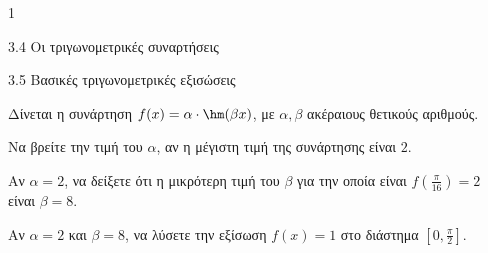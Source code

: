 \begin{ylh}{1}
\item 3.4 Οι τριγωνομετρικές συναρτήσεις
\item 3.5 Βασικές τριγωνομετρικές εξισώσεις
\end{ylh}
Δίνεται η συνάρτηση $f(x) = \alpha \cdot \hm (\beta x)$, με $\alpha, \beta$ ακέραιους θετικούς αριθμούς.\\
\begin{alist}
\item Να βρείτε την τιμή του $\alpha$, αν η μέγιστη τιμή της συνάρτησης είναι $2$.
\item Αν $\alpha = 2$, να δείξετε ότι η μικρότερη τιμή του $\beta$ για την οποία είναι $f\left(\frac{\pi}{16}\right) = 2$ είναι $\beta = 8$.
\item Αν $\alpha = 2$ και $\beta = 8$, να λύσετε την εξίσωση $f(x) = 1$ στο διάστημα $\left[0, \frac{\pi}{2}\right]$.
\end{alist}


